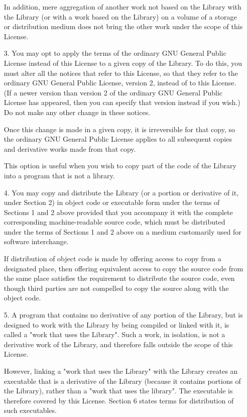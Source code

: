 \begin{itemize}
In addition, mere aggregation of another work not based on the Library
with the Library (or with a work based on the Library) on a volume of
a storage or distribution medium does not bring the other work under
the scope of this License.

\item[3.]  You may opt to apply the terms of the ordinary GNU General Public
License instead of this License to a given copy of the Library.  To do
this, you must alter all the notices that refer to this License, so
that they refer to the ordinary GNU General Public License, version 2,
instead of to this License.  (If a newer version than version 2 of the
ordinary GNU General Public License has appeared, then you can specify
that version instead if you wish.)  Do not make any other change in
these notices.

  Once this change is made in a given copy, it is irreversible for
that copy, so the ordinary GNU General Public License applies to all
subsequent copies and derivative works made from that copy.

  This option is useful when you wish to copy part of the code of
the Library into a program that is not a library.

\item[4.]  You may copy and distribute the Library (or a portion or
derivative of it, under Section 2) in object code or executable form
under the terms of Sections 1 and 2 above provided that you accompany
it with the complete corresponding machine-readable source code, which
must be distributed under the terms of Sections 1 and 2 above on a
medium customarily used for software interchange.

  If distribution of object code is made by offering access to copy
from a designated place, then offering equivalent access to copy the
source code from the same place satisfies the requirement to
distribute the source code, even though third parties are not
compelled to copy the source along with the object code.

\item[5.] 
   A program that contains no derivative of any portion of the
Library, but is designed to work with the Library by being compiled or
linked with it, is called a "work that uses the Library".  Such a
work, in isolation, is not a derivative work of the Library, and
therefore falls outside the scope of this License.

  However, linking a "work that uses the Library" with the Library
creates an executable that is a derivative of the Library (because it
contains portions of the Library), rather than a "work that uses the
library".  The executable is therefore covered by this License.
Section 6 states terms for distribution of such executables.


\end{itemize}
